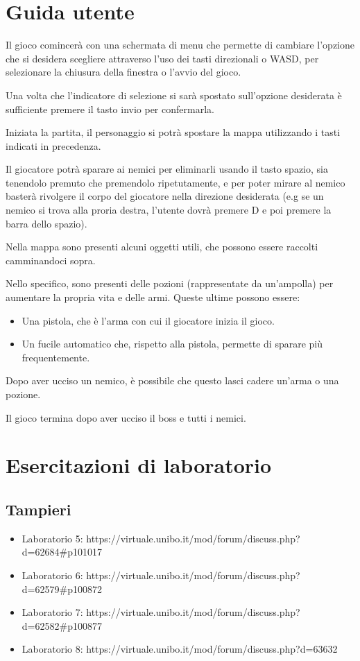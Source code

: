 \documentclass[a4paper,12pt]{report}
\begin{document}
    \chapter{Guida utente}
    \par Il gioco comincerà con una schermata di menu che permette di cambiare l'opzione che si desidera scegliere attraverso l'uso
    dei tasti direzionali o  WASD, per selezionare la chiusura della finestra o l'avvio del gioco.
    \par Una volta che l'indicatore di selezione si sarà spostato sull'opzione desiderata è sufficiente premere il tasto invio per confermarla.
    \par Iniziata la partita, il personaggio si potrà spostare la mappa utilizzando i tasti indicati in precedenza.
    \par Il giocatore potrà sparare ai nemici per eliminarli usando il tasto spazio, sia tenendolo premuto che premendolo ripetutamente,
    e per poter mirare al nemico basterà rivolgere il corpo del giocatore nella direzione desiderata (e.g se un nemico si trova alla
    proria destra, l'utente dovrà premere D e poi premere la barra dello spazio).
    \par Nella mappa sono presenti alcuni oggetti utili, che possono essere raccolti camminandoci sopra.
    \par Nello specifico, sono presenti delle pozioni (rappresentate da un'ampolla) per aumentare la propria vita e delle armi. Queste ultime possono essere:
    \begin{itemize}
        \item Una pistola, che è l'arma con cui il giocatore inizia il gioco.
        \item Un fucile automatico che, rispetto alla pistola, permette di sparare più frequentemente.
    \end{itemize}
    \par Dopo aver ucciso un nemico, è possibile che questo lasci cadere un'arma o una pozione.
    \par Il gioco termina dopo aver ucciso il boss e tutti i nemici.
    \chapter{Esercitazioni di laboratorio}
    \section{Tampieri}
    \begin{itemize}
        \item Laboratorio 5: https://virtuale.unibo.it/mod/forum/discuss.php?d=62684\#p101017
        \item Laboratorio 6: https://virtuale.unibo.it/mod/forum/discuss.php?d=62579\#p100872
        \item Laboratorio 7: https://virtuale.unibo.it/mod/forum/discuss.php?d=62582\#p100877
        \item Laboratorio 8: https://virtuale.unibo.it/mod/forum/discuss.php?d=63632
    \end{itemize}
    \printbibliography[heading=bibintoc]
\end{document}
